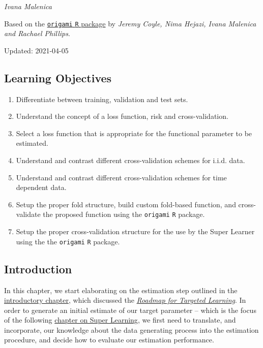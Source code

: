\documentclass[12pt, krantz2,]{krantz}
\providecommand{\tightlist}{%
  \setlength{\itemsep}{0pt}\setlength{\parskip}{0pt}}
\theoremstyle{definition}
\theoremstyle{definition}
\theoremstyle{definition}
\newcommand{\1}{\mathbbm{1}}
\begin{document}
\emph{Ivana Malenica}

Based on the \href{https://github.com/tlverse/origami}{\texttt{origami} \texttt{R} package}
by \emph{Jeremy Coyle, Nima Hejazi, Ivana Malenica and Rachael Phillips}.

Updated: 2021-04-05

\hypertarget{learning-objectives-2}{%
\subsection{Learning Objectives}\label{learning-objectives-2}}

\begin{enumerate}
\def\labelenumi{\arabic{enumi}.}
\tightlist
\item
  Differentiate between training, validation and test sets.
\item
  Understand the concept of a loss function, risk and cross-validation.
\item
  Select a loss function that is appropriate for the functional parameter to be
  estimated.
\item
  Understand and contrast different cross-validation schemes for i.i.d. data.
\item
  Understand and contrast different cross-validation schemes for time dependent
  data.
\item
  Setup the proper fold structure, build custom fold-based function, and
  cross-validate the proposed function using the \texttt{origami} \texttt{R} package.
\item
  Setup the proper cross-validation structure for the use by the Super Learner
  using the the \texttt{origami} \texttt{R} package.
\end{enumerate}

\hypertarget{introduction-1}{%
\subsection{Introduction}\label{introduction-1}}

In this chapter, we start elaborating on the estimation step outlined in the
\protect\hyperlink{intro}{introductory chapter}, which discussed the \protect\hyperlink{roadmap}{\emph{Roadmap for Targeted
Learning}}. In order to generate an initial estimate of our target
parameter -- which is the focus of the following \protect\hyperlink{sl3}{chapter on Super
Learning}, we first need to translate, and incorporate, our knowledge
about the data generating process into the estimation procedure, and decide how
to evaluate our estimation performance.
\end{document}
